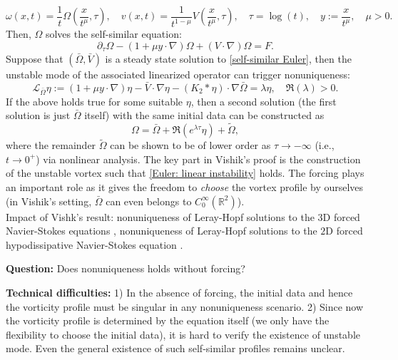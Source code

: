 \documentclass{article}
\newcommand{\reall}{\mathbb{R}}
\newcommand{\dr}[1]{\left(#1\right)}
\newcommand{\pa}{\partial}
\numberwithin{equation}{section}
\newcommand{\Lc}{\mathcal{L}}
\begin{document}
\begin{equation}\label{self-similar change of variables mu}
    \omega(x,t) = \frac{1}{t}\Omega\dr{\frac{x}{t^{\mu}},\tau},\quad v(x,t) =\frac{1}{t^{1-\mu}}V\dr{\frac{x}{t^{\mu}},\tau} ,\quad \tau = \log(t),\quad y:=\frac{x}{t^{\mu}},\quad \mu>0.
\end{equation}
Then, $\Omega$ solves the self-similar equation:
\begin{equation}\label{self-similar Euler}
    \pa_\tau \Omega - \dr{1+\mu y\cdot\nabla}\Omega + (V\cdot\nabla)\Omega = F.
\end{equation}
Suppose that $(\bar \Omega, \bar V)$ is a steady state solution to \eqref{self-similar Euler}, then the unstable mode of the associated linearized operator can trigger nonuniqueness:
\begin{equation}\label{Euler: linear instability}
    \Lc_{\bar\Omega}\eta :=(1+\mu y\cdot\nabla)\eta-\bar V\cdot\nabla\eta - (K_2*\eta)\cdot\nabla\bar\Omega = \lambda\eta,\quad \Re(\lambda)>0. 
\end{equation}
If the above holds true for some suitable $\eta$, then a second solution (the first solution is just $\bar\Omega$ itself) with the same initial data can be constructed as
\begin{equation}
    \Omega = \bar\Omega + \Re\dr{e^{\lambda\tau}\eta}+ \tilde\Omega,
\end{equation}
where the remainder $\tilde \Omega$ can be shown to be of lower order as $\tau\to -\infty$ (i.e., $t\to 0^+$) via nonlinear analysis. The key part in Vishik's proof is the construction of the unstable vortex such that \eqref{Euler: linear instability} holds. The forcing plays an important role as it gives the freedom to \textit{choose} the vortex profile by ourselves (in Vishik's setting, $\bar \Omega$ can even belongs to $C^\infty_0(\reall^2)$). \\
Impact of Vishk's result: nonuniqueness of Leray-Hopf solutions to the $3$D forced Navier-Stokes equations \cite{abc_forcing}, nonuniqueness of Leray-Hopf solutions to the $2$D forced hypodissipative Navier-Stokes equation \cite{hypoNS_force23}.

\textbf{Question:} Does nonuniqueness holds without forcing?

\textbf{Technical difficulties:} 1) In the absence of forcing, the initial data and hence the vorticity profile must be singular in any nonuniqueness scenario. 2) Since now the vorticity profile is determined by the equation itself (we only have the flexibility to choose the initial data), it is hard to verify the existence of unstable mode. Even the general existence of such self-similar profiles remains unclear. 
\end{document}
